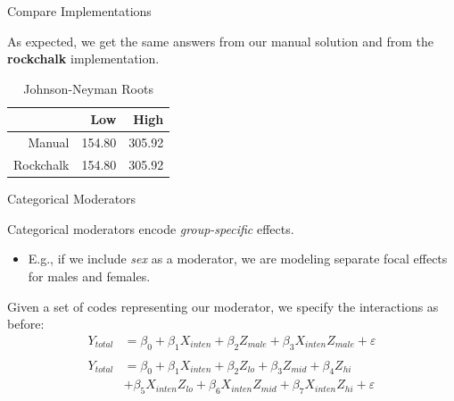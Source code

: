 \documentclass{beamer}\usepackage[]{graphicx}\usepackage[]{color}
\begin{document}

\captionsetup{labelformat = empty}
\begin{frame}{Compare Implementations}
  
  As expected, we get the same answers from our manual solution and from the 
  \textbf{rockchalk} implementation.
  
\begin{table}[ht]
\centering
\begin{tabular}{rrr}
  \toprule
 & Low & High \\ 
  \midrule
Manual & 154.80 & 305.92 \\ 
  Rockchalk & 154.80 & 305.92 \\ 
   \bottomrule
\end{tabular}
\caption{Johnson-Neyman Roots} 
\end{table}


\end{frame}
\captionsetup{labelformat = default}

\watermarkon %

\begin{frame}{Categorical Moderators}
  
  Categorical moderators encode \emph{group-specific} effects.
  \vb
  \begin{itemize}
  \item E.g., if we include \emph{sex} as a moderator, we are modeling separate
    focal effects for males and females.
  \end{itemize}
  \va 
  Given a set of codes representing our moderator, we specify the
  interactions as before:
  \begin{align*}
    Y_{total} &= \beta_0 + \beta_1 X_{inten} + \beta_2 Z_{male} + 
    \beta_3 X_{inten}Z_{male} + \varepsilon\\\\
    Y_{total} &= \beta_0 + \beta_1 X_{inten} + \beta_2 Z_{lo} + \beta_3 Z_{mid} + 
    \beta_4 Z_{hi}\\ 
    &+ \beta_5 X_{inten}Z_{lo} + \beta_6 X_{inten}Z_{mid} + \beta_7 X_{inten}Z_{hi} + 
    \varepsilon
  \end{align*}
  
\end{frame}

\watermarkoff %
\end{document}

